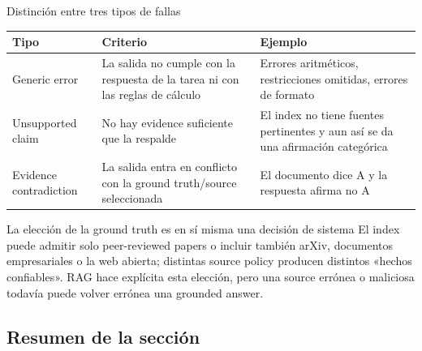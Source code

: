 \documentclass[a4paper]{article}
\begin{document}
\begin{importantbox}{Distinción entre tres tipos de fallas}
\begin{tabularx}{\textwidth}{L{0.20\textwidth}>{\raggedright\arraybackslash}X >{\raggedright\arraybackslash}X}
\toprule
Tipo & Criterio & Ejemplo \\
\midrule
Generic error & La salida no cumple con la respuesta de la tarea ni con las reglas de cálculo & Errores aritméticos, restricciones omitidas, errores de formato \\
Unsupported claim & No hay evidence suficiente que la respalde & El index no tiene fuentes pertinentes y aun así se da una afirmación categórica \\
Evidence contradiction & La salida entra en conflicto con la ground truth/source seleccionada & El documento dice A y la respuesta afirma no A \\
\bottomrule
\end{tabularx}
\end{importantbox}

\begin{warningbox}{La elección de la ground truth es en sí misma una decisión de sistema}
El index puede admitir solo peer-reviewed papers o incluir también arXiv, documentos empresariales o la web abierta; distintas source policy producen distintos «hechos confiables». RAG hace explícita esta elección, pero una source errónea o maliciosa todavía puede volver errónea una grounded answer.
\end{warningbox}



\subsection{Resumen de la sección}
\end{document}
